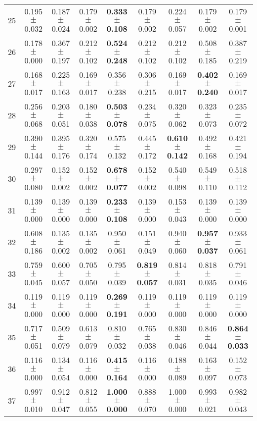 \begin{table}[!ht]
{\begin{tabular}{r c c c c c c c c}
25 & 0.195 $\pm$ 0.032 & 0.187 $\pm$ 0.024 & 0.179 $\pm$ 0.002 & \textbf{0.333 $\pm$ 0.108} & 0.179 $\pm$ 0.002 & 0.224 $\pm$ 0.057 & 0.179 $\pm$ 0.002 & 0.179 $\pm$ 0.001 \\
26 & 0.178 $\pm$ 0.000 & 0.367 $\pm$ 0.197 & 0.212 $\pm$ 0.102 & \textbf{0.524 $\pm$ 0.248} & 0.212 $\pm$ 0.102 & 0.212 $\pm$ 0.102 & 0.508 $\pm$ 0.185 & 0.387 $\pm$ 0.219 \\
27 & 0.168 $\pm$ 0.017 & 0.225 $\pm$ 0.163 & 0.169 $\pm$ 0.017 & 0.356 $\pm$ 0.238 & 0.306 $\pm$ 0.215 & 0.169 $\pm$ 0.017 & \textbf{0.402 $\pm$ 0.240} & 0.169 $\pm$ 0.017 \\
28 & 0.256 $\pm$ 0.068 & 0.203 $\pm$ 0.051 & 0.180 $\pm$ 0.038 & \textbf{0.503 $\pm$ 0.078} & 0.234 $\pm$ 0.075 & 0.320 $\pm$ 0.062 & 0.323 $\pm$ 0.073 & 0.235 $\pm$ 0.072 \\
29 & 0.390 $\pm$ 0.144 & 0.395 $\pm$ 0.176 & 0.320 $\pm$ 0.174 & 0.575 $\pm$ 0.132 & 0.445 $\pm$ 0.172 & \textbf{0.610 $\pm$ 0.142} & 0.492 $\pm$ 0.168 & 0.421 $\pm$ 0.194 \\
30 & 0.297 $\pm$ 0.080 & 0.152 $\pm$ 0.002 & 0.152 $\pm$ 0.002 & \textbf{0.678 $\pm$ 0.077} & 0.152 $\pm$ 0.002 & 0.540 $\pm$ 0.098 & 0.549 $\pm$ 0.110 & 0.518 $\pm$ 0.112 \\
31 & 0.139 $\pm$ 0.000 & 0.139 $\pm$ 0.000 & 0.139 $\pm$ 0.000 & \textbf{0.233 $\pm$ 0.108} & 0.139 $\pm$ 0.000 & 0.153 $\pm$ 0.043 & 0.139 $\pm$ 0.000 & 0.139 $\pm$ 0.000 \\
32 & 0.608 $\pm$ 0.186 & 0.135 $\pm$ 0.002 & 0.135 $\pm$ 0.002 & 0.950 $\pm$ 0.061 & 0.151 $\pm$ 0.049 & 0.940 $\pm$ 0.060 & \textbf{0.957 $\pm$ 0.037} & 0.933 $\pm$ 0.061 \\
33 & 0.759 $\pm$ 0.045 & 0.600 $\pm$ 0.057 & 0.705 $\pm$ 0.050 & 0.795 $\pm$ 0.039 & \textbf{0.819 $\pm$ 0.057} & 0.814 $\pm$ 0.031 & 0.818 $\pm$ 0.035 & 0.791 $\pm$ 0.046 \\
34 & 0.119 $\pm$ 0.000 & 0.119 $\pm$ 0.000 & 0.119 $\pm$ 0.000 & \textbf{0.269 $\pm$ 0.191} & 0.119 $\pm$ 0.000 & 0.119 $\pm$ 0.000 & 0.119 $\pm$ 0.000 & 0.119 $\pm$ 0.000 \\
35 & 0.717 $\pm$ 0.051 & 0.509 $\pm$ 0.079 & 0.613 $\pm$ 0.079 & 0.810 $\pm$ 0.032 & 0.765 $\pm$ 0.038 & 0.830 $\pm$ 0.046 & 0.846 $\pm$ 0.044 & \textbf{0.864 $\pm$ 0.033} \\
36 & 0.116 $\pm$ 0.000 & 0.134 $\pm$ 0.054 & 0.116 $\pm$ 0.000 & \textbf{0.415 $\pm$ 0.164} & 0.116 $\pm$ 0.000 & 0.188 $\pm$ 0.089 & 0.163 $\pm$ 0.097 & 0.152 $\pm$ 0.073 \\
37 & 0.997 $\pm$ 0.010 & 0.912 $\pm$ 0.047 & 0.812 $\pm$ 0.055 & \textbf{1.000 $\pm$ 0.000} & 0.888 $\pm$ 0.070 & 1.000 $\pm$ 0.000 & 0.993 $\pm$ 0.021 & 0.982 $\pm$ 0.043 \\

\end{tabular}}
\end{table}
